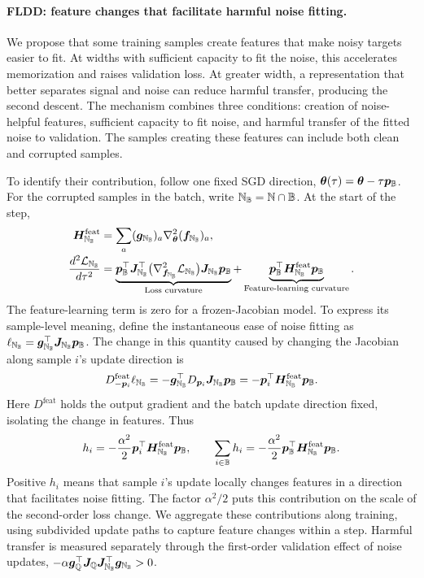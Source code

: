 \documentclass[10pt]{article}
\begin{document}
\paragraph{FLDD: feature changes that facilitate harmful noise fitting.}
We propose that some training samples create features that make noisy targets easier to fit. At widths with sufficient capacity to fit the noise, this accelerates memorization and raises validation loss. At greater width, a representation that better separates signal and noise can reduce harmful transfer, producing the second descent. The mechanism combines three conditions: creation of noise-helpful features, sufficient capacity to fit noise, and harmful transfer of the fitted noise to validation. The samples creating these features can include both clean and corrupted samples.

To identify their contribution, follow one fixed SGD direction, ${\bm{\theta}}(\tau)={\bm{\theta}}-\tau{\bm{p}}_{{\mathbb{B}}}$. For the corrupted samples in the batch, write ${\mathbb{N}}_{{\mathbb{B}}}={\mathbb{N}}\cap{\mathbb{B}}$. At the start of the step,
\begin{align}
 {\bm{H}}_{{\mathbb{N}}_{{\mathbb{B}}}}^{\mathrm{feat}}
 &=\sum_a({\bm{g}}_{{\mathbb{N}}_{{\mathbb{B}}}})_a\nabla_{{\bm{\theta}}}^2({\bm{f}}_{{\mathbb{N}}_{{\mathbb{B}}}})_a,
 \\[-2pt]
 \frac{d^2\mathcal L_{{\mathbb{N}}_{{\mathbb{B}}}}}{d\tau^2}
 &=\underbrace{{\bm{p}}_{{\mathbb{B}}}^{\top}{\bm{J}}_{{\mathbb{N}}_{{\mathbb{B}}}}^{\top}
 \bigl(\nabla_{{\bm{f}}_{{\mathbb{N}}_{{\mathbb{B}}}}}^2\mathcal L_{{\mathbb{N}}_{{\mathbb{B}}}}\bigr)
 {\bm{J}}_{{\mathbb{N}}_{{\mathbb{B}}}}{\bm{p}}_{{\mathbb{B}}}}_{\text{Loss curvature}}
 +\underbrace{{\bm{p}}_{{\mathbb{B}}}^{\top}{\bm{H}}_{{\mathbb{N}}_{{\mathbb{B}}}}^{\mathrm{feat}}{\bm{p}}_{{\mathbb{B}}}}_{\text{Feature-learning curvature}}.
 \label{eq:curvature}
\end{align}
The feature-learning term is zero for a frozen-Jacobian model. To express its sample-level meaning, define the instantaneous ease of noise fitting as $\ell_{{\mathbb{N}}_{{\mathbb{B}}}}={\bm{g}}_{{\mathbb{N}}_{{\mathbb{B}}}}^\top{\bm{J}}_{{\mathbb{N}}_{{\mathbb{B}}}}{\bm{p}}_{{\mathbb{B}}}$. The change in this quantity caused by changing the Jacobian along sample $i$'s update direction is
\begin{equation}
 D_{-{\bm{p}}_i}^{\mathrm{feat}}\ell_{{\mathbb{N}}_{{\mathbb{B}}}}
 =-{\bm{g}}_{{\mathbb{N}}_{{\mathbb{B}}}}^\top
 D_{{\bm{p}}_i}{\bm{J}}_{{\mathbb{N}}_{{\mathbb{B}}}}
 {\bm{p}}_{{\mathbb{B}}}
 =-{\bm{p}}_i^\top{\bm{H}}_{{\mathbb{N}}_{{\mathbb{B}}}}^{\mathrm{feat}}{\bm{p}}_{{\mathbb{B}}}.
 \label{eq:ease}
\end{equation}
Here $D^{\mathrm{feat}}$ holds the output gradient and the batch update direction fixed, isolating the change in features. Thus
\begin{equation}
 h_i=-\frac{\alpha^2}{2}{\bm{p}}_i^\top{\bm{H}}_{{\mathbb{N}}_{{\mathbb{B}}}}^{\mathrm{feat}}{\bm{p}}_{{\mathbb{B}}},
 \qquad
 \sum_{i\in{\mathbb{B}}}h_i=
 -\frac{\alpha^2}{2}{\bm{p}}_{{\mathbb{B}}}^\top{\bm{H}}_{{\mathbb{N}}_{{\mathbb{B}}}}^{\mathrm{feat}}{\bm{p}}_{{\mathbb{B}}}.
 \label{eq:help}
\end{equation}
Positive $h_i$ means that sample $i$'s update locally changes features in a direction that facilitates noise fitting. The factor $\alpha^2/2$ puts this contribution on the scale of the second-order loss change. We aggregate these contributions along training, using subdivided update paths to capture feature changes within a step. Harmful transfer is measured separately through the first-order validation effect of noise updates, $-\alpha{\bm{g}}_{{\mathbb{Q}}}^\top{\bm{J}}_{{\mathbb{Q}}}{\bm{J}}_{{\mathbb{N}}_{{\mathbb{B}}}}^\top{\bm{g}}_{{\mathbb{N}}_{{\mathbb{B}}}}>0$.
\end{document}
